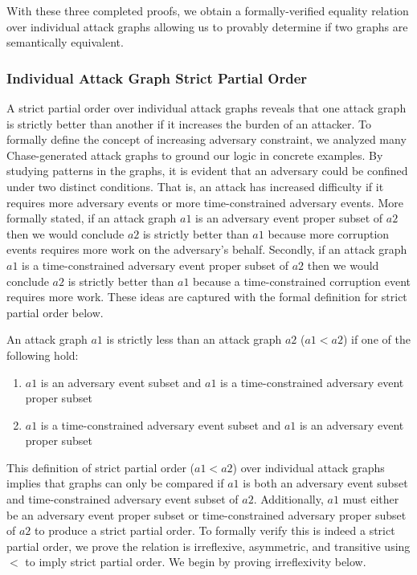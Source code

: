 \documentclass[runningheads]{llncs}
\theoremstyle{definition}
\newcommand{\squash}{\itemsep=0pt\parskip=0pt}
\begin{document}
\noindent With these three completed proofs, we obtain a formally-verified equality relation over individual attack graphs allowing us to provably determine if two graphs are semantically equivalent.

\subsubsection*{Individual Attack Graph Strict Partial Order}

A strict partial order over individual attack graphs reveals that one attack graph is strictly better than another if it increases the burden of an attacker. To formally define the concept of increasing adversary constraint, we analyzed many Chase-generated attack graphs to ground our logic in concrete examples. By studying patterns in the graphs, it is evident that an adversary could be confined under two distinct conditions. That is, an attack has increased difficulty if it requires more adversary events or more time-constrained adversary events. More formally stated, if an attack graph $a1$ is an adversary event proper subset of $a2$ then we would conclude $a2$ is strictly better than $a1$ because more corruption events requires more work on the adversary's behalf. Secondly, if an attack graph $a1$ is a time-constrained adversary event proper subset of $a2$ then we would conclude $a2$ is strictly better than $a1$ because a time-constrained corruption event requires more work. These ideas are captured with the formal definition for strict partial order below.

\begin{definition}
    An attack graph $a1$ is strictly less than an attack graph $a2$ ($a1 < a2$) if one of the following hold: 
\begin{enumerate}
    \squash
    \item $a1$ is an adversary event subset and $a1$ is a time-constrained adversary event proper subset
    \item $a1$ is a time-constrained adversary event subset and $a1$ is an adversary event proper subset
\end{enumerate}
\end{definition}

This definition of strict partial order ($a1 < a2$) over individual attack graphs implies that graphs can only be compared if $a1$ is both an adversary event subset and time-constrained adversary event subset of $a2$. Additionally, $a1$ must either be an adversary event proper subset or time-constrained adversary proper subset of $a2$ to produce a strict partial order. To formally verify this is indeed a strict partial order, we prove the relation is irreflexive, asymmetric, and transitive using $<$ to imply strict partial order. We begin by proving irreflexivity below.
\end{document}
